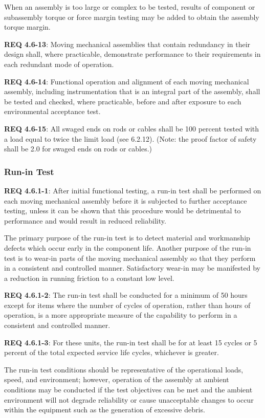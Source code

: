 \documentclass[12pt]{article}
\begin{document}
When an assembly is too large or complex to be tested, results of component or subassembly torque or force margin testing may be added to obtain the assembly torque margin. 

\noindent \textbf{REQ 4.6-13}: Moving mechanical assemblies that contain redundancy in their design shall, where practicable, demonstrate performance to their requirements in each redundant mode of operation. 

\noindent \textbf{REQ 4.6-14}: Functional operation and alignment of each moving mechanical assembly, including instrumentation that is an integral part of the assembly, shall be tested and checked, where practicable, before and after exposure to each environmental acceptance test. 

\noindent \textbf{REQ 4.6-15}: All swaged ends on rods or cables shall be 100 percent tested with a load equal to twice the limit load (see 6.2.12). 
(Note: the proof factor of safety shall be 2.0 for swaged ends on rods or cables.)


\subsubsection{Run-in Test} %
\noindent \textbf{REQ 4.6.1-1}: After initial functional testing, a run-in test shall be performed on each moving mechanical assembly before it is subjected to further acceptance testing, unless it can be shown that this procedure would be detrimental to performance and would result in reduced reliability. 

The primary purpose of the run-in test is to detect material and workmanship defects which occur early in the component life. 
Another purpose of the run-in test is to wear-in parts of the moving mechanical assembly so that they perform in a consistent and controlled manner. 
Satisfactory wear-in may be manifested by a reduction in running friction to a constant low level. 

\noindent \textbf{REQ 4.6.1-2}: The run-in test shall be conducted for a minimum of 50 hours except for items where the number of cycles of operation, rather than hours of operation, is a more appropriate measure of the capability to perform in a consistent and controlled manner. 

\noindent \textbf{REQ 4.6.1-3}: For these units, the run-in test shall be for at least 15 cycles or 5 percent of the total expected service life cycles, whichever is greater. 

The run-in test conditions should be representative of the operational loads, speed, and environment; however, operation of the assembly at ambient conditions may be conducted if the test objectives can be met and the ambient environment will not degrade reliability or cause unacceptable changes to occur within the equipment such as the generation of excessive debris. 
\end{document}
